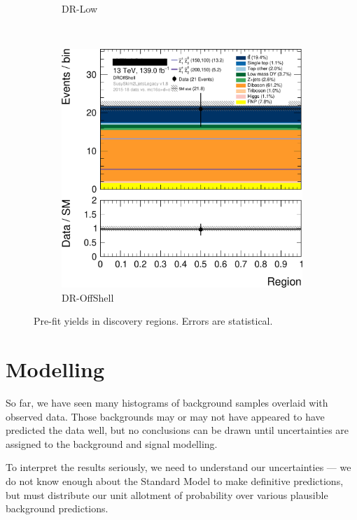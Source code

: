 \begin{figure}[tp]
\begin{subfigure}{0.38\textwidth}
\caption{DR-Low}
\end{subfigure}
\\[0.5em]
\begin{subfigure}{0.38\textwidth}
\centering
\includegraphics[width=\textwidth]{figures/2ljets_disco_plot_DROffShell.png}
\caption{DR-OffShell}
\end{subfigure}
\caption[
Pre-fit yields in discovery regions
]{%
Pre-fit yields in discovery regions.
Errors are statistical.
}
\label{fig:2ljets_disco_prefit}
\end{figure}

\FloatBarrier
\section{Modelling}
\label{sec:2ljets_modelling}
So far, we have seen many histograms of background samples overlaid with
observed data.
Those backgrounds may or may not have appeared to have predicted the data well,
but no conclusions can be drawn until uncertainties are assigned to the
background and signal modelling.

To interpret the results seriously, we need to understand our uncertainties ---
we do not know enough about the Standard Model to make definitive predictions,
but must distribute our unit allotment of probability over various plausible
background predictions.

